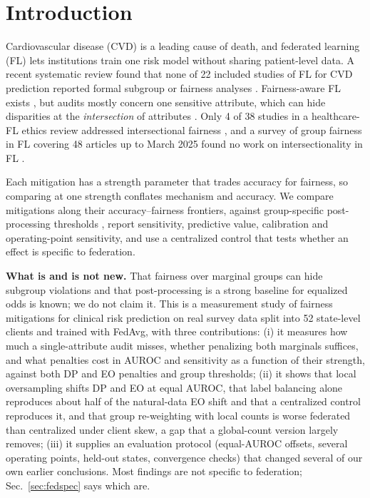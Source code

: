 \documentclass[conference]{IEEEtran}
\begin{document}
\section{Introduction}
Cardiovascular disease (CVD) is a leading cause of death, and federated learning (FL) \cite{mcmahan2017} lets institutions train one risk model without sharing patient-level data. A recent systematic review found that none of 22 included studies of FL for CVD prediction reported formal subgroup or fairness analyses \cite{li2026}. Fairness-aware FL exists \cite{li2020qffl,ezzeldin2023,li2025fairfml,wu2025fedida}, but audits mostly concern one sensitive attribute, which can hide disparities at the \emph{intersection} of attributes \cite{crenshaw1989,buolamwini2018,foulds2020,kearns2018}. Only 4 of 38 studies in a healthcare-FL ethics review addressed intersectional fairness \cite{mir2026}, and a survey of group fairness in FL covering 48 articles up to March 2025 found no work on intersectionality in FL \cite{salazar2024}.

Each mitigation has a strength parameter that trades accuracy for fairness, so comparing at one strength conflates mechanism and accuracy. We compare mitigations along their accuracy--fairness frontiers, against group-specific post-processing thresholds \cite{hardt2016}, report sensitivity, predictive value, calibration and operating-point sensitivity, and use a centralized control that tests whether an effect is specific to federation.

\textbf{What is and is not new.} That fairness over marginal groups can hide subgroup violations \cite{kearns2018,foulds2020} and that post-processing is a strong baseline for equalized odds \cite{hardt2016} is known; we do not claim it. This is a measurement study of fairness mitigations for clinical risk prediction on real survey data split into 52 state-level clients and trained with FedAvg, with three contributions: (i) it measures how much a single-attribute audit misses, whether penalizing both marginals suffices, and what penalties cost in AUROC and sensitivity as a function of their strength, against both DP and EO penalties and group thresholds; (ii) it shows that local oversampling shifts DP and EO at equal AUROC, that label balancing alone reproduces about half of the natural-data EO shift and that a centralized control reproduces it, and that group re-weighting with local counts is worse federated than centralized under client skew, a gap that a global-count version largely removes; (iii) it supplies an evaluation protocol (equal-AUROC offsets, several operating points, held-out states, convergence checks) that changed several of our own earlier conclusions. Most findings are not specific to federation; Sec.~\ref{sec:fedspec} says which are.
\end{document}
